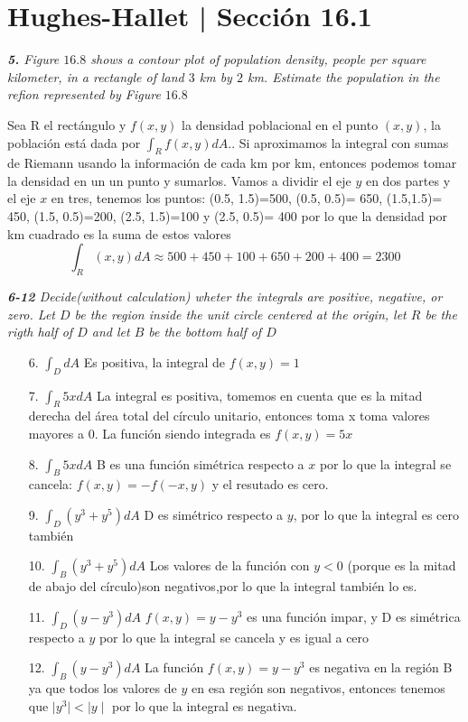 \documentclass[a4paper,12pt]{article}
\begin{document}
	\section{Hughes-Hallet | Sección 16.1}
	\textit{\textbf{5.} Figure $16.8$ shows a contour plot of population density, people per square kilometer, in a rectangle of land $3$ km by $2$ km. Estimate the population in the refion represented by Figure $16.8$}

Sea R el rectángulo y $f(x,y)$ la densidad poblacional en el punto $(x,y)$, la población está dada por $\int_{R}f(x,y)dA$.. Si aproximamos la integral con sumas de Riemann usando la información de cada km por km, entonces podemos tomar la densidad en un un punto y sumarlos. 
Vamos a dividir el eje $y$ en dos partes y el eje $x$ en tres, tenemos los puntos: 
(0.5, 1.5)=500, (0.5, 0.5)= 650, (1.5,1.5)= 450, (1.5, 0.5)=200, (2.5, 1.5)=100 y (2.5, 0.5)= 400
por lo que la densidad por km cuadrado es la suma de estos valores
\[\int_{R}(x,y)dA\approx 500 + 450 + 100 + 650 + 200 + 400 = 2300\]

\textit{\textbf{6-12} Decide(without calculation) wheter the integrals are positive, negative, or zero. Let $D$ be the region inside the unit circle centered at the origin, let $R$ be the rigth half of $D$ and let $B$ be the bottom half of $D$}
\begin{itemize}
	\item[6.]$\int_{D}dA$
	         Es positiva, la integral de $f(x,y) = 1$
	\item[7.]$\int_{R}5xdA$
			  La integral es positiva, tomemos en cuenta que es la mitad derecha del área total del círculo unitario, entonces toma x toma valores mayores a $0$. La función siendo integrada es $f(x,y) = 5x$
	\item[8.]$\int_{B}5xdA$
			  B es una función simétrica respecto a $x$ por lo que la integral se cancela: $f(x,y) = -f (-x,y)$ y el resutado es cero.
	\item[9.]$\int_{D}(y^3 + y^5)dA$
		  	   D es simétrico respecto a $y$, por lo que la integral es cero también
	\item[10.]$\int_{B}(y^3+y^5)dA$
			   Los valores de la función con $y < 0$ (porque es la mitad de abajo del círculo)son negativos,por lo que la integral también lo es.
	\item[11.]$\int_{D}(y-y^3)dA$
				$f(x,y) = y- y^3$ es una función impar, y D es simétrica respecto a $y$ por lo que la integral se cancela y es igual a cero
	\item[12.]$\int_{B}(y-y^3)dA$	
			 La función $f(x,y) = y -y^3$ es negativa en la región B ya que todos los valores de $y$ en esa región son negativos, entonces tenemos que $\mid y^3 \mid < \mid y \mid$ por lo que la integral es negativa. 
\end{itemize}
\end{document}
